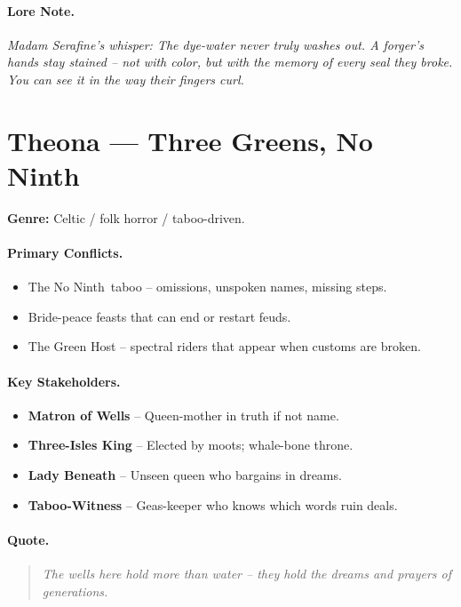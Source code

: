 \paragraph{Lore Note.}
\emph{Madam Serafine's whisper: \textquotedbl The dye-water never truly washes out. A forger's hands stay stained -- not with color, but with the memory of every seal they broke. You can see it in the way their fingers curl.\textquotedbl}

\section{Theona --- \textquotedbl Three Greens, No Ninth\textquotedbl}
\textbf{Genre:} Celtic / folk horror / taboo-driven.

\paragraph{Primary Conflicts.}
\begin{itemize}
  \item The \textquotedbl No Ninth\textquotedbl\ taboo -- omissions, unspoken names, missing steps.
  \item Bride-peace feasts that can end or restart feuds.
  \item The Green Host -- spectral riders that appear when customs are broken.
\end{itemize}

\paragraph{Key Stakeholders.}
\begin{itemize}
  \item \textbf{Matron of Wells} -- Queen-mother in truth if not name.
  \item \textbf{Three-Isles King} -- Elected by moots; whale-bone throne.
  \item \textbf{Lady Beneath} -- Unseen queen who bargains in dreams.
  \item \textbf{Taboo-Witness} -- Geas-keeper who knows which words ruin deals.
\end{itemize}

\paragraph{Quote.}
\begin{quote}
\emph{\textquotedbl The wells here hold more than water -- they hold the dreams and prayers of generations.\textquotedbl}
\end{quote}

